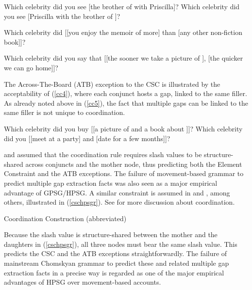 \documentclass[output=paper
 	        ,biblatex
                ,babelshorthands
                ,newtxmath
                ,draftmode
                ,colorlinks, citecolor=brown
]{langscibook}
\begin{document}
 

\eal
\label{cc2}
\zl

\eal 
\label{cc3} 
\ex Which celebrity did you see [the brother of \spc with Priscilla]?
\ex Which celebrity did you see [Priscilla with the brother of \spc]?
\zl

\eal
\label{compar} 
\ex Which celebrity did  [[you enjoy the memoir of \spcs more] than
                                 [any other non-fiction book]]?

\ex Which celebrity did you say that [[the sooner we take a picture of \spc ],
[the quicker we can go home]]?
\zl


The Across-The-Board (ATB) exception to the CSC is illustrated by the acceptability of (\ref{cc4}), where each conjunct hosts a gap, linked to the same filler. As already noted above in (\ref{cc5}), the fact that multiple gaps can be linked to the same filler is not unique to  coordination. 

\eal\label{cc4}
\ex Which celebrity did you buy [[a picture of  \spcs and a book about \spcs]]?
\ex Which celebrity  did you [[meet \spcs at a party] and [date \spcs for a few months]]?
\zl


\citet{gazdar} and \citet{gpsg} assumed that the coordination rule  requires {\sc slash} values to be structure-shared across conjuncts and the mother node, thus  predicting  both the Element Constraint and the ATB exceptions. The failure of
movement-based grammar to predict multiple gap extraction facts was also seen
as a major empirical advantage of GPSG/HPSG. A similar constraint is assumed in \citet[202]{pollardsag} and
\citet[60]{Beavers}, among others, illustrated in (\ref{cschpsgr}). See   for more discussion about coordination. 

\ea
\label{cschpsgr}
{\sc Coordination Construction} (abbreviated)

\z

\noindent
Because   the {\sc slash} value  is structure-shared between the mother and the daughters
in (\ref{cschpsgr}),  all  three nodes must bear the same {\sc slash} value.  This predicts the CSC and the ATB exceptions  straightforwardly. The failure of mainstream Chomskyan  grammar to predict these and related multiple  gap extraction facts in a precise way is regarded as one of the  major empirical advantages of HPSG  over movement-based accounts.
\end{document}
